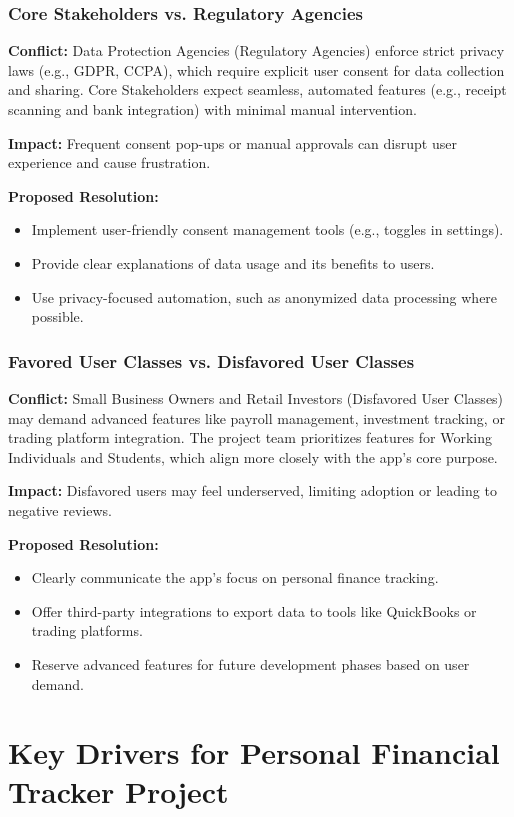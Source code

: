 \subsubsection{Core Stakeholders vs. Regulatory Agencies}
\textbf{Conflict:} Data Protection Agencies (Regulatory Agencies) enforce strict privacy laws (e.g., GDPR, CCPA), which require explicit user consent for data collection and sharing. Core Stakeholders expect seamless, automated features (e.g., receipt scanning and bank integration) with minimal manual intervention.

\textbf{Impact:} Frequent consent pop-ups or manual approvals can disrupt user experience and cause frustration.

\textbf{Proposed Resolution:}
\begin{itemize}
    \item Implement user-friendly consent management tools (e.g., toggles in settings).
    \item Provide clear explanations of data usage and its benefits to users.
    \item Use privacy-focused automation, such as anonymized data processing where possible.
\end{itemize}

\subsubsection{Favored User Classes vs. Disfavored User Classes}
\textbf{Conflict:} Small Business Owners and Retail Investors (Disfavored User Classes) may demand advanced features like payroll management, investment tracking, or trading platform integration. The project team prioritizes features for Working Individuals and Students, which align more closely with the app’s core purpose.

\textbf{Impact:} Disfavored users may feel underserved, limiting adoption or leading to negative reviews.

\textbf{Proposed Resolution:}
\begin{itemize}
    \item Clearly communicate the app’s focus on personal finance tracking.
    \item Offer third-party integrations to export data to tools like QuickBooks or trading platforms.
    \item Reserve advanced features for future development phases based on user demand.
\end{itemize}

\section{Key Drivers for Personal Financial Tracker Project}

